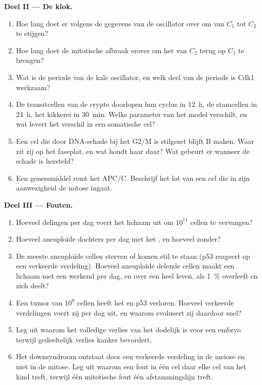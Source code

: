 \begin{problem}
\medskip
\noindent\textbf{Deel II --- De klok.}
\begin{enumerate}[resume]
  \item Hoe lang doet  er volgens de gegevens van de oscillator
        over om van $C_{1}$ tot $C_{2}$ te stijgen?
  \item Hoe lang doet de mitotische afbraak erover om het van $C_{2}$
        terug op $C_{1}$ te brengen?
  \item Wat is de periode van de kale oscillator, en welk deel van de
        periode is Cdk1 werkzaam?
  \item De transitcellen van de crypte doorlopen hun cyclus in
        \qty{12}{h}, de stamcellen in \qty{24}{h}, het kikkerei in
        \qty{30}{min}. Welke parameter van het model verschilt, en wat
        levert het verschil in een somatische cel?
  \item Een cel die door DNA-schade bij het  G2/M is
        stilgezet blijft  B maken. Waar zit zij op het faseplat,
        en wat houdt haar daar? Wat gebeurt er wanneer de schade is
        hersteld?
  \item Een geneesmiddel remt het APC/C. Beschrijf het lot van een cel
        die in zijn aanwezigheid de mitose ingaat.
\end{enumerate}

\medskip
\noindent\textbf{Deel III --- Fouten.}
\begin{enumerate}[resume]
  \item Hoeveel delingen per dag voert het lichaam uit om $10^{11}$
        cellen te vervangen?
  \item Hoeveel aneuploïde dochters per dag met het , en
        hoeveel zonder?
  \item De meeste aneuploïde cellen sterven of komen stil te staan (p53
        reageert op een verkeerde verdeling). Hoeveel aneuploïde
        delende cellen maakt een lichaam met een werkend 
        per dag, en over een heel leven, als \qty{1}{\%} overleeft en
        zich deelt?
  \item Een tumor van $10^{9}$ cellen heeft het  en p53
        verloren. Hoeveel verkeerde verdelingen voert zij per dag uit,
        en waarom evolueert zij daardoor snel?
  \item Leg uit waarom het volledige verlies van het  dodelijk is voor een embryo terwijl gedeeltelijk
        verlies kanker bevordert.
  \item Het downsyndroom ontstaat door een verkeerde verdeling in de
        meiose en niet in de mitose. Leg uit waarom een fout in één cel
        daar elke cel van het kind treft, terwijl één mitotische fout
        één afstammingslijn treft.
\end{enumerate}


\end{problem}
